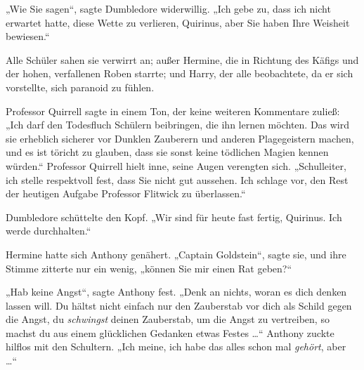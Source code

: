 „Wie Sie sagen“, sagte Dumbledore widerwillig. „Ich gebe zu, dass ich nicht erwartet hatte, diese Wette zu verlieren, Quirinus, aber Sie haben Ihre Weisheit bewiesen.“

Alle Schüler sahen sie verwirrt an; außer Hermine, die in Richtung des Käfigs und der hohen, verfallenen Roben starrte; und Harry, der alle beobachtete, da er sich vorstellte, sich paranoid zu fühlen.

Professor Quirrell sagte in einem Ton, der keine weiteren Kommentare zuließ: „Ich darf den Todesfluch Schülern beibringen, die ihn lernen möchten. Das wird sie erheblich sicherer vor Dunklen Zauberern und anderen Plagegeistern machen, und es ist töricht zu glauben, dass sie sonst keine tödlichen Magien kennen würden.“ Professor Quirrell hielt inne, seine Augen verengten sich. „Schulleiter, ich stelle respektvoll fest, dass Sie nicht gut aussehen. Ich schlage vor, den Rest der heutigen Aufgabe Professor Flitwick zu überlassen.“

Dumbledore schüttelte den Kopf. „Wir sind für heute fast fertig, Quirinus. Ich werde durchhalten.“

Hermine hatte sich Anthony genähert. „Captain Goldstein“, sagte sie, und ihre Stimme zitterte nur ein wenig, „können Sie mir einen Rat geben?“

„Hab keine Angst“, sagte Anthony fest. „Denk an nichts, woran es dich denken lassen will. Du hältst nicht einfach nur den Zauberstab vor dich als Schild gegen die Angst, du \emph{schwingst} deinen Zauberstab, um die Angst zu vertreiben, so machst du aus einem glücklichen Gedanken etwas Festes …“ Anthony zuckte hilflos mit den Schultern. „Ich meine, ich habe das alles schon mal \emph{gehört}, aber …“

